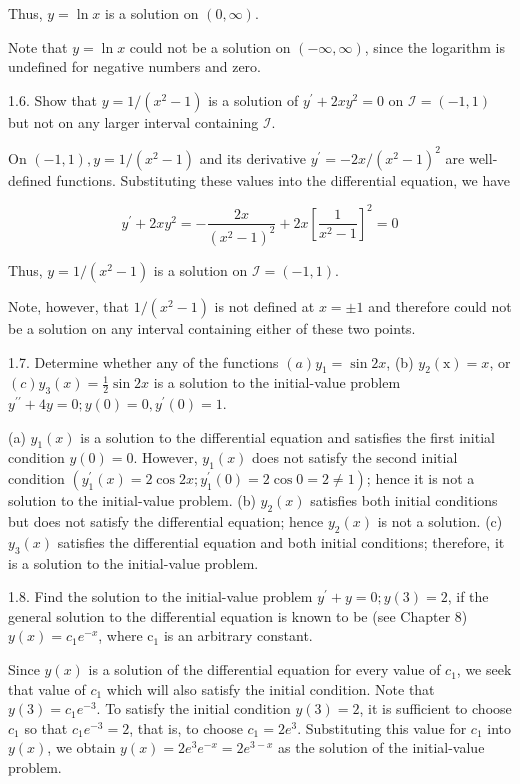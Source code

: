 \documentclass[10pt]{article}
\begin{document}
Thus, $y=\ln x$ is a solution on $(0, \infty)$.

Note that $y=\ln x$ could not be a solution on $(-\infty, \infty)$, since the logarithm is undefined for negative numbers and zero.

1.6. Show that $y=1 /\left(x^{2}-1\right)$ is a solution of $y^{\prime}+2 x y^{2}=0$ on $\mathscr{I}=(-1,1)$ but not on any larger interval containing $\mathscr{I}$.

On $(-1,1), y=1 /\left(x^{2}-1\right)$ and its derivative $y^{\prime}=-2 x /\left(x^{2}-1\right)^{2}$ are well-defined functions. Substituting these values into the differential equation, we have

$$
y^{\prime}+2 x y^{2}=-\frac{2 x}{\left(x^{2}-1\right)^{2}}+2 x\left[\frac{1}{x^{2}-1}\right]^{2}=0
$$

Thus, $y=1 /\left(x^{2}-1\right)$ is a solution on $\mathscr{I}=(-1,1)$.

Note, however, that $1 /\left(x^{2}-1\right)$ is not defined at $x= \pm 1$ and therefore could not be a solution on any interval containing either of these two points.

1.7. Determine whether any of the functions $(a) y_{1}=\sin 2 x$, (b) $y_{2}(\mathrm{x})=x$, or $(c) y_{3}(x)=\frac{1}{2} \sin 2 x$ is a solution to the initial-value problem $y^{\prime \prime}+4 y=0 ; y(0)=0, y^{\prime}(0)=1$.

(a) $y_{1}(x)$ is a solution to the differential equation and satisfies the first initial condition $y(0)=0$. However, $y_{1}(x)$ does not satisfy the second initial condition $\left(y_{1}^{\prime}(x)=2 \cos 2 x ; y_{1}^{\prime}(0)=2 \cos 0=2 \neq 1\right)$; hence it is not a solution to the initial-value problem. (b) $y_{2}(x)$ satisfies both initial conditions but does not satisfy the differential equation; hence $y_{2}(x)$ is not a solution. (c) $y_{3}(x)$ satisfies the differential equation and both initial conditions; therefore, it is a solution to the initial-value problem.

1.8. Find the solution to the initial-value problem $y^{\prime}+y=0 ; y(3)=2$, if the general solution to the differential equation is known to be (see Chapter 8) $y(x)=c_{1} e^{-x}$, where $\mathrm{c}_{1}$ is an arbitrary constant.

Since $y(x)$ is a solution of the differential equation for every value of $c_{1}$, we seek that value of $c_{1}$ which will also satisfy the initial condition. Note that $y(3)=c_{1} e^{-3}$. To satisfy the initial condition $y(3)=2$, it is sufficient to choose $c_{1}$ so that $c_{1} e^{-3}=2$, that is, to choose $c_{1}=2 e^{3}$. Substituting this value for $c_{1}$ into $y(x)$, we obtain $y(x)=2 e^{3} e^{-x}=2 e^{3-x}$ as the solution of the initial-value problem.
\end{document}
